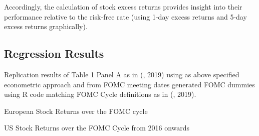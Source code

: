 Accordingly, the calculation of stock excess returns provides insight into their 
performance relative to the risk-free rate (using 1-day excess returns and 5-day excess returns graphically).

\subsection{Regression Results}

\begin{table}[h]
\begin{center}
\begin{adjustbox}{width=1\textwidth}

\end{tabular}
}
\end{adjustbox}
\caption{\label{table_1} Replication results of Table 1 Panel A as in (\cite{cieslak_stock_2019}, 2019) using as above specified econometric approach and from FOMC meeting dates generated FOMC dummies using R code matching FOMC Cycle definitions as in (\cite{cieslak_stock_2019}, 2019).  }
\end{center}
\end{table}

\begin{table}[h]
\begin{center}
\begin{adjustbox}{width=1\textwidth}

\end{tabular}
}
\end{adjustbox}
\caption{\label{table_2} European Stock Returns over the FOMC cycle}
\end{center}
\end{table}


\begin{table}[h]
\begin{center}
\begin{adjustbox}{width=1\textwidth}

\end{tabular}
}
\end{adjustbox}
\caption{\label{table_3} US Stock Returns over the FOMC Cycle from 2016 onwards}
\end{center}
\end{table}


